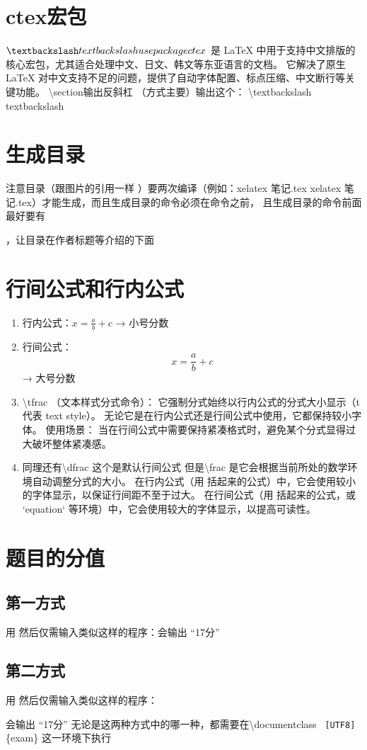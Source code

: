 \documentclass[UTF8]{ctexart}
\begin{document}
\section{ctex宏包}
 $\textbackslash textbackslash usepackage{ctex}$ 是 LaTeX 中用于支持中文排版的核心宏包，尤其适合处理中文、日文、韩文等东亚语言的文档。
它解决了原生 LaTeX 对中文支持不足的问题，提供了自动字体配置、标点压缩、中文断行等关键功能。
\textbackslash section{输出反斜杠}
（方式主要）输出这个：  \textbackslash textbackslash textbackslash
\section{生成目录}
注意目录（跟图片的引用一样 ）要两次编译（例如：xelatex 笔记.tex xelatex 笔记.tex）才能生成，而且生成目录的命令必须在\pagestyle{plain}命令之前，
且生成目录的命令前面最好要有\maketitle，让目录在作者标题等介绍的下面
\section{行间公式和行内公式}
\begin{enumerate} 
 \item 行内公式：$ x = \frac{a}{b} + c $ → 小号分数  \\
 \item 行间公式：\[ x = \frac{a}{b} + c \] → 大号分数
 \item \textbackslash tfrac{ }{ }（文本样式分式命令）：
       它强制分式始终以行内公式的分式大小显示（t 代表 text style）。
       无论它是在行内公式还是行间公式中使用，它都保持较小字体。
      使用场景：
      当在行间公式中需要保持紧凑格式时，避免某个分式显得过大破坏整体紧凑感。
\item 同理还有\textbackslash dfrac{}{}  这个是默认行间公式
      但是\textbackslash frac{ }{ }是它会根据当前所处的数学环境自动调整分式的大小。
在行内公式（用  括起来的公式）中，它会使用较小的字体显示，以保证行间距不至于过大。
在行间公式（用 括起来的公式，或 `equation` 等环境）中，它会使用较大的字体显示，以提高可读性。
\end{enumerate}
\section{题目的分值}
\subsection{第一方式}
用 %
然后仅需输入类似这样的程序：\question[17] 会输出 “17分”
\subsection{第二方式}
用\renewcommand{\pointformat}{[\arabic{points} 分]} %
然后仅需输入类似这样的程序：
\begin{questions}
\question[17]
\end{questions} 
会输出 “17分”
无论是这两种方式中的哪一种，都需要在\textbackslash documentclass \texttt{ [UTF8]} \{exam\}
这一环境下执行
\end{document}
